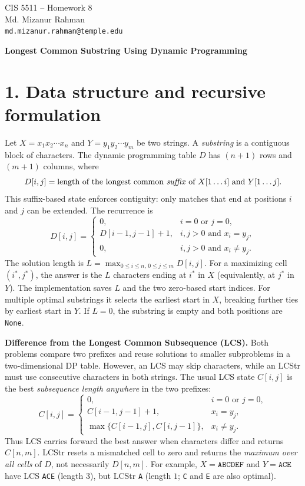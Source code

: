 \documentclass[11pt,a4paper]{article}
\newcommand{\code}[1]{\texttt{#1}}
\begin{document}
\thispagestyle{plain}
\begin{center}
  {\large CIS 5511 -- Homework 8}\\[3pt]
  Md. Mizanur Rahman\\[-1pt]
  \texttt{md.mizanur.rahman@temple.edu}
\end{center}
\vspace{6pt}
{\large\bfseries Longest Common Substring Using Dynamic Programming}\par

\section*{1. Data structure and recursive formulation}
Let $X=x_1x_2\cdots x_n$ and $Y=y_1y_2\cdots y_m$ be two strings.
A \emph{substring} is a contiguous block of characters. The dynamic programming
table $D$ has $(n+1)$ rows and $(m+1)$ columns, where
\[
 D[i,j]=\text{length of the longest common \emph{suffix} of }
 X[1\ldots i]\text{ and }Y[1\ldots j].
\]
This suffix-based state enforces contiguity: only matches that end at positions
$i$ and $j$ can be extended. The recurrence is
\[
 D[i,j]=\begin{cases}
 0, & i=0\text{ or }j=0,\\
 D[i-1,j-1]+1, & i,j>0\text{ and }x_i=y_j,\\
 0, & i,j>0\text{ and }x_i\ne y_j.
 \end{cases}
\]
The solution length is $L=\max_{0\leq i\leq n,\,0\leq j\leq m}D[i,j]$.
For a maximizing cell $(i^*,j^*)$, the answer is the $L$ characters ending at
$i^*$ in $X$ (equivalently, at $j^*$ in $Y$). The implementation saves $L$
and the two zero-based start indices. For multiple optimal substrings it
selects the earliest start in $X$, breaking further ties by earliest start in
$Y$. If $L=0$, the substring is empty and both positions are \code{None}.

\textbf{Difference from the Longest Common Subsequence (LCS).}
Both problems compare two prefixes and reuse solutions to smaller subproblems
in a two-dimensional DP table. However, an LCS may skip characters, while an
LCStr must use consecutive characters in both strings. The usual LCS state
$C[i,j]$ is the best \emph{subsequence length anywhere} in the two prefixes:
\[
 C[i,j]=\begin{cases}
 0, & i=0\text{ or }j=0,\\
 C[i-1,j-1]+1, & x_i=y_j,\\
 \max\{C[i-1,j],C[i,j-1]\}, & x_i\ne y_j.
 \end{cases}
\]
Thus LCS carries forward the best answer when characters differ and returns
$C[n,m]$. LCStr resets a mismatched cell to zero and returns the \emph{maximum
over all cells} of $D$, not necessarily $D[n,m]$. For example,
$X=\code{ABCDEF}$ and $Y=\code{ACE}$ have LCS \code{ACE} (length $3$),
but LCStr \code{A} (length $1$; \code{C} and \code{E} are also optimal).
\end{document}
